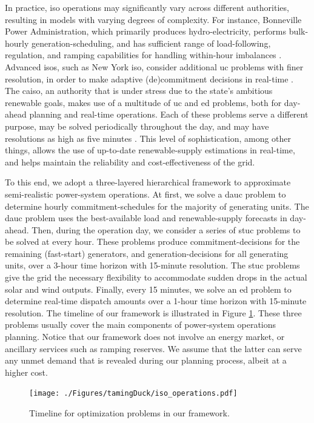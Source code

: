 In practice, \gls{iso} operations may significantly vary across different authorities, resulting in models with varying degrees of complexity. For instance, Bonneville Power Administration, which primarily produces hydro-electricity, performs bulk-hourly generation-scheduling, and has sufficient range of load-following, regulation, and ramping capabilities for handling within-hour imbalances \citep{Makarov2010}. Advanced \glspl{iso}, such as New York \gls{iso}, consider additional \gls{uc} problems with finer resolution, in order to make adaptive (de)commitment decisions in real-time \citep{NYISO2017}. The \gls{caiso}, an authority that is under stress due to the state's ambitious renewable goals, makes use of a multitude of \gls{uc} and \gls{ed} problems, both for day-ahead planning and real-time operations. Each of these problems serve a different purpose, may be solved periodically throughout the day, and may have resolutions as high as five minutes \citep{CAISO2017b}. This level of sophistication, among other things, allows the use of up-to-date renewable-supply estimations in real-time, and helps maintain the reliability and cost-effectiveness of the grid.

To this end, we adopt a three-layered hierarchical framework to approximate semi-realistic power-system operations. At first, we solve a \gls{dauc} problem to determine hourly commitment-schedules for the majority of generating units. The \gls{dauc} problem uses the best-available load and renewable-supply forecasts in day-ahead. Then, during the operation day, we consider a series of \gls{stuc} problems to be solved at every hour. These problems produce commitment-decisions for the remaining (fast-start) generators, and generation-decisions for all generating units, over a 3-hour time horizon with 15-minute resolution. The \gls{stuc} problems give the grid the necessary flexibility to accommodate sudden drops in the actual solar and wind outputs. Finally, every 15 minutes, we solve an \gls{ed} problem to determine real-time dispatch amounts over a 1-hour time horizon with 15-minute resolution. The timeline of our framework is illustrated in Figure \ref{ch:td:fig:framework}. These three problems usually cover the main components of power-system operations planning. Notice that our framework does not involve an energy market, or ancillary services such as ramping reserves. We assume that the latter can serve any unmet demand that is revealed during our planning process, albeit at a higher cost. 

\begin{figure}[h]
\centering
\texttt{[image: ./Figures/tamingDuck/iso\_operations.pdf]}
\caption{Timeline for optimization problems in our framework.}
\label{ch:td:fig:framework}
\end{figure}

